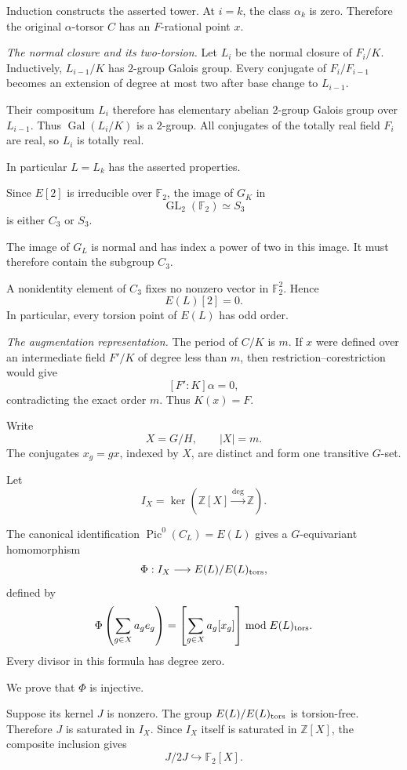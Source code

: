 \documentclass[11pt]{article}
\begin{document}
Induction constructs the asserted tower.
At $i=k$, the class $\alpha_k$ is zero.
Therefore the original $\alpha$-torsor $C$
has an $F$-rational point $x$.

\medskip
\emph{The normal closure and its two-torsion.}
Let $L_i$ be the normal closure of $F_i/K$.
Inductively, $L_{i-1}/K$ has $2$-group Galois
group. Every conjugate of $F_i/F_{i-1}$ becomes
an extension of degree at most two after base
change to $L_{i-1}$.

Their compositum $L_i$ therefore has elementary
abelian $2$-group Galois group over $L_{i-1}$.
Thus $\operatorname{Gal}(L_i/K)$ is a $2$-group.
All conjugates of the totally real field $F_i$
are real, so $L_i$ is totally real.

In particular $L=L_k$ has the asserted
properties.

Since $E[2]$ is irreducible over $\mathbb F_2$,
the image of $G_K$ in
\[
\operatorname{GL}_2(\mathbb F_2)\simeq S_3
\]
is either $C_3$ or $S_3$.

The image of $G_L$ is normal and has index a
power of two in this image. It must therefore
contain the subgroup $C_3$.

A nonidentity element of $C_3$ fixes no
nonzero vector in $\mathbb F_2^2$. Hence
\[
E(L)[2]=0.
\]
In particular, every torsion point of $E(L)$
has odd order.

\medskip
\emph{The augmentation representation.}
The period of $C/K$ is $m$.
If $x$ were defined over an intermediate field
$F'/K$ of degree less than $m$, then
restriction--corestriction would give
\[
[F':K]\alpha=0,
\]
contradicting the exact order $m$.
Thus $K(x)=F$.

Write
\[
X=G/H,\qquad |X|=m.
\]
The conjugates $x_g=gx$, indexed by $X$, are
distinct and form one transitive $G$-set.

Let
\[
I_X=\ker\left(\mathbb Z[X]
\xrightarrow{\deg}\mathbb Z\right).
\]

The canonical identification
$\operatorname{Pic}^0(C_L)=E(L)$ gives a
$G$-equivariant homomorphism
\[
\Phi:I_X\longrightarrow E(L)/E(L)_{\rm tors},
\]
defined by
\[
\Phi\left(\sum_{g\in X}a_ge_g\right)
=
\left[\sum_{g\in X}a_g[x_g]\right]
\bmod E(L)_{\rm tors}.
\]
Every divisor in this formula has degree zero.

We prove that $\Phi$ is injective.

Suppose its kernel $J$ is nonzero.
The group $E(L)/E(L)_{\rm tors}$ is
torsion-free. Therefore $J$ is saturated in
$I_X$. Since $I_X$ itself is saturated in
$\mathbb Z[X]$, the composite inclusion gives
\[
J/2J\hookrightarrow
\mathbb F_2[X].
\]
\end{document}
